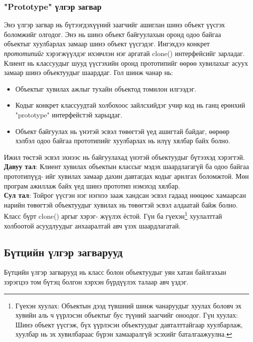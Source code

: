 \subsubsection{"Prototype" үлгэр загвар}
\quad \quad Энэ үлгэр загвар нь бүтээгдэхүүний заагчийг ашиглан шинэ объект үүсгэх боломжийг олгодог. Энэ нь шинэ объект байгуулахын оронд одоо байгаа объектыг хуулбарлах замаар шинэ объект үүсгэдэг. Ингэхдээ конкрет \textit{прототипийг} хэрэгжүүлдэг ихэвчлэн нэг аргатай clone() интерфейсийг зарладаг. Клиент нь классуудыг шууд үүсгэхийн оронд прототипийг өөрөө хувилахыг асуух замаар шинэ объектуудыг шаарддаг. Гол шинж чанар нь:
\begin{itemize}
	\item Объектыг хувилах ажлыг тухайн объектод томилон илгээдэг.
	\item Кодыг конкрет классуудтай холбохоос зайлсхийдэг учир код нь ганц ерөнхий "prototype" интерфейстэй харьцдаг.
	\item Объект байгуулах нь үнэтэй эсвэл төвөгтэй үед ашигтай байдаг, өөрөөр хэлбэл одоо байгаа прототипийг хуулбарлах нь илүү хялбар байх болно.
\end{itemize}
Ижил төстэй эсвэл эхнээс нь байгуулахад үнэтэй объектуудыг бүтээхэд хэрэгтэй.\\
\textbf{Давуу тал}: Клиент хувилах объектын классыг мэдэх шаардлагагүй ба одоо байгаа прототипүүд- ийг хувилах замаар дахин давтагдах кодыг арилгах боломжтой. Мөн програм ажиллаж байх үед шинэ прототип нэмэхэд хялбар.\\
\textbf{Сул тал}: Тойрог үүсгэн нэг нэгнээ зааж хандсан эсвэл гадаад нөөцөөс хамаарсан нарийн төвөгтэй объектуудыг хувилах нь төвөгтэй эсвэл алдаатай байж болно. Класс бүрт  clone()  аргыг хэрэг- жүүлэх ёстой. Гүн ба гүехэн\footnote{
	Гүехэн хуулах: Объектын дээд түвшний шинж чанаруудыг хуулах боловч эх хувийн аль ч үүрлэсэн объектыг бус түүний заагчийг оноодог.
	Гүн хуулах: Шинэ объект үүсгэж, бүх үүрлэсэн объектуудыг давталттайгаар хуулбарлаж, хуулбар нь эх хувилбараас бүрэн хамааралгүй эсэхийг баталгаажуулна.
} хуулалттай холбоотой асуудлуудыг анхааралтай авч үзэх шаардлагатай.

\subsection{Бүтцийн үлгэр загварууд}
Бүтцийн үлгэр загварууд нь класс болон объектуудыг уян хатан байлгахын зэрэгцээ том бүтэц болгон хэрхэн бүрдүүлэх талаар авч үздэг.




